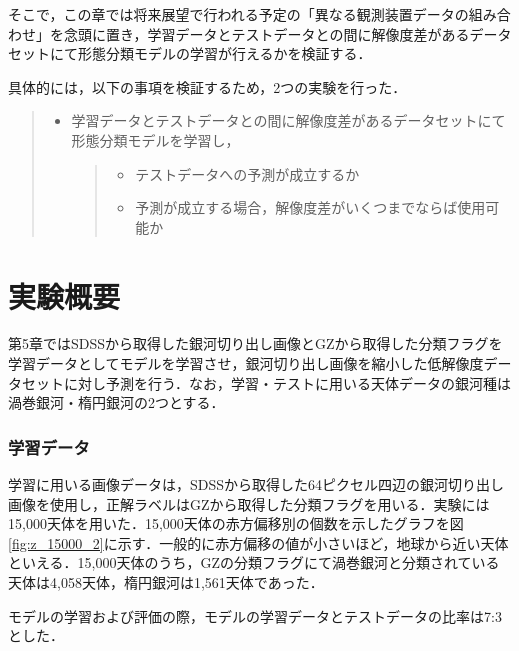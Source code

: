 \documentclass[a4j, 11pt]{jreport}
\begin{document}
そこで，この章では将来展望で行われる予定の「異なる観測装置データの組み合わせ」を念頭に置き，学習データとテストデータとの間に解像度差があるデータセットにて形態分類モデルの学習が行えるかを検証する．

具体的には，以下の事項を検証するため，2つの実験を行った．

\begin{quote}
 \begin{itemize}
  \item 学習データとテストデータとの間に解像度差があるデータセットにて形態分類モデルを学習し，
  \begin{quote}
   \begin{itemize}
    \item テストデータへの予測が成立するか
    \item 予測が成立する場合，解像度差がいくつまでならば使用可能か
   \end{itemize}
  \end{quote}
 \end{itemize}
\end{quote}

\section{実験概要}
第5章ではSDSSから取得した銀河切り出し画像とGZから取得した分類フラグを学習データとしてモデルを学習させ，銀河切り出し画像を縮小した低解像度データセットに対し予測を行う．なお，学習・テストに用いる天体データの銀河種は渦巻銀河・楕円銀河の2つとする．
\subsubsection{学習データ}
学習に用いる画像データは，SDSSから取得した64ピクセル四辺の銀河切り出し画像を使用し，正解ラベルはGZから取得した分類フラグを用いる．実験には15,000天体を用いた．15,000天体の赤方偏移別の個数を示したグラフを図\ref{fig:z_15000_2}に示す．一般的に赤方偏移の値が小さいほど，地球から近い天体といえる．15,000天体のうち，GZの分類フラグにて渦巻銀河と分類されている天体は4,058天体，楕円銀河は1,561天体であった．

モデルの学習および評価の際，モデルの学習データとテストデータの比率は7:3とした．
\end{document}
